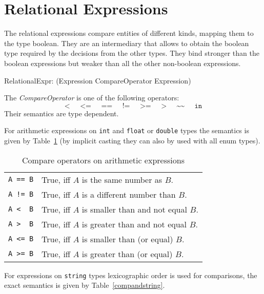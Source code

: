 \section{Relational Expressions}\label{sec:relational}

The relational expressions compare entities of different kinds, mapping them to the type boolean.
They are an intermediary that allows to obtain the boolean type required by the decisions from the other types.
They bind stronger than the boolean expressions but weaker than all the other non-boolean expressions.

\begin{rail}
 RelationalExpr: (Expression CompareOperator Expression)
\end{rail}

The \emph{CompareOperator} is one of the following operators:
\[ \texttt{<} \;\;\;\;\; \texttt{<=} \;\;\;\;\; \texttt{==} \;\;\;\;\; \texttt{!=} \;\;\;\;\; \texttt{>=} \;\;\;\;\; \texttt{>} \;\;\;\;\; \texttt{\textasciitilde\textasciitilde} \;\;\;\;\; \texttt{in} \]
Their semantics are type dependent.

For arithmetic expressions on \texttt{int} and \texttt{float} or \texttt{double} types
the semantics is given by Table~\ref{compandarithmetic} (by implicit casting they can also by used with all enum types).

\begin{table}[htbp]
  \centering
  \begin{tabularx}{\linewidth}{|l|X|} \hline
    \texttt{A == B} & True, iff $A$ is the same number as $B$. \\
    \texttt{A != B} & True, iff $A$ is a different number than $B$. \\
    \texttt{A <\ \ B} & True, iff $A$ is smaller than and not equal $B$. \\
    \texttt{A >\ \ B} & True, iff $A$ is greater than and not equal $B$. \\
    \texttt{A <= B} & True, iff $A$ is smaller than (or equal) $B$. \\
    \texttt{A >= B} & True, iff $A$ is greater than (or equal) $B$. \\ \hline
  \end{tabularx}
  \caption{Compare operators on arithmetic expressions}
  \label{compandarithmetic}
\end{table}

For expressions on \texttt{string} types lexicographic order is used for comparisons,
the exact semantics is given by Table~\ref{compandstring}.

